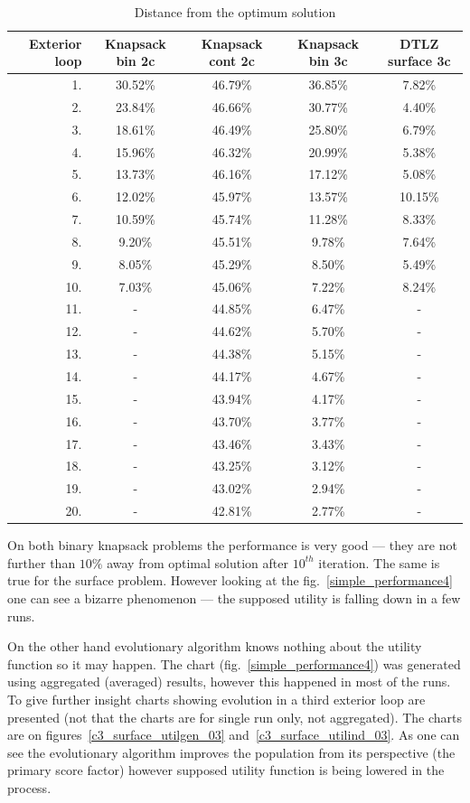 \begin{table}
  \centering
  \caption{Distance from the optimum solution}
  \label{t:opt_dist}
  \begin{tabular}{r c c c c}
    \hline
    Exterior loop & Knapsack bin 2c & Knapsack cont 2c & Knapsack bin 3c &
    DTLZ surface 3c \\
    \hline
    \hline
    1. & 30.52\% & 46.79\% & 36.85\% & 7.82\% \\
    2. & 23.84\% & 46.66\% & 30.77\% & 4.40\% \\
    3. & 18.61\% & 46.49\% & 25.80\% & 6.79\% \\
    4. & 15.96\% & 46.32\% & 20.99\% & 5.38\% \\
    5. & 13.73\% & 46.16\% & 17.12\% & 5.08\% \\
    6. & 12.02\% & 45.97\% & 13.57\% & 10.15\% \\
    7. & 10.59\% & 45.74\% & 11.28\% & 8.33\% \\
    8. & 9.20\% & 45.51\% & 9.78\% & 7.64\% \\
    9. & 8.05\% & 45.29\% & 8.50\% & 5.49\% \\
    10. & 7.03\% & 45.06\% & 7.22\% & 8.24\% \\
    11. & - & 44.85\% & 6.47\% & - \\
    12. & - & 44.62\% & 5.70\% & - \\
    13. & - & 44.38\% & 5.15\% & - \\
    14. & - & 44.17\% & 4.67\% & - \\
    15. & - & 43.94\% & 4.17\% & - \\
    16. & - & 43.70\% & 3.77\% & - \\
    17. & - & 43.46\% & 3.43\% & - \\
    18. & - & 43.25\% & 3.12\% & - \\
    19. & - & 43.02\% & 2.94\% & - \\
    20. & - & 42.81\% & 2.77\% & - \\
    \hline
  \end{tabular}
\end{table}

On both binary knapsack problems the performance is very good --- they are not
further than $10\%$ away from optimal solution after $10^{th}$ iteration. The
same is true for the surface problem. However looking at the
fig.~\ref{simple_performance4} one can see a bizarre phenomenon --- the
supposed utility is falling down in a few runs.

On the other hand evolutionary algorithm knows nothing about the utility
function so it may happen. The chart (fig.~\ref{simple_performance4}) was
generated using aggregated (averaged) results, however this happened in most
of the runs. To give further insight charts showing evolution in a third
exterior loop are presented (not that the charts are for single run only, not
aggregated). The charts are on figures~\ref{c3_surface_utilgen_03}
and~\ref{c3_surface_utilind_03}. As one can see the evolutionary algorithm
improves the population from its perspective (the primary score factor)
however supposed utility function is being lowered in the process.

